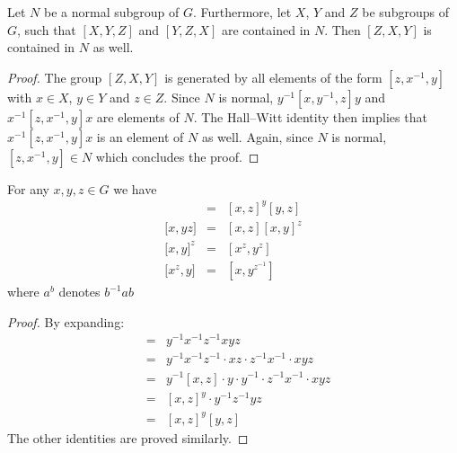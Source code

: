 \documentclass[12pt]{article}
\newcommand{\<}{\langle}
\renewcommand{\>}{\rangle}
\begin{document}
\begin{thm}
Let $N$ be a normal subgroup of $G$. Furthermore, let $X$, $Y$ and $Z$
be subgroups of $G$, such that $[X,Y,Z]$ and $[Y,Z,X]$ are contained
in $N$. Then $[Z,X,Y]$ is contained in $N$ as well.
\end{thm}
\begin{proof}
The group $[Z,X,Y]$ is generated by all elements of the form
$[z,x^{-1},y]$ with $x\in X$, $y\in Y$ and $z\in Z$. Since $N$ is
normal, $y^{-1}[x,y^{-1},z]y$ and $x^{-1}[z,x^{-1},y]x$ are elements
of $N$. The Hall--Witt identity then implies that
$x^{-1}[z,x^{-1},y]x$ is an element of $N$ as well. Again, since $N$
is normal, $[z,x^{-1},y]\in N$ which concludes the proof.
\end{proof}

\begin{thm} For any $x, y, z \in G$ we have
\begin{eqnarray*} [xy, z] & = & [x,z]^y [y,z] \\
 {[}x,yz] & = & [x,z][x,y]^z \\
 {[}x,y]^z & = & [x^z, y^z] \\
 {[}x^z, y] & = & [x, y^{z^{-1}}] 
\end{eqnarray*}
where $a^b$ denotes $b^{-1} a b$ \end{thm}
\begin{proof}
By expanding:
\begin{eqnarray*} [xy,z] & = & y^{-1}x^{-1} z^{-1} xyz \\
& = & y^{-1} x^{-1} z^{-1} \cdot xz \cdot z^{-1} x^{-1} \cdot xyz \\
&=& y^{-1} [x,z] \cdot y \cdot y^{-1} \cdot z^{-1} x^{-1} \cdot xyz \\
&=& [x,z]^y \cdot y^{-1} z^{-1} y z \\
&=& [x,z]^y [y,z]
\end{eqnarray*}
The other identities are proved similarly.
\end{proof}
\end{document}
